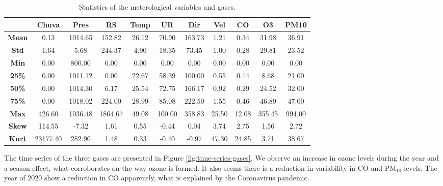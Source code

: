\begin{table*}[t]
    \centering
    \begin{tabular}{|c|c|c|c|c|c|c|c|c|c|c|}
        \hline
        {} & {\bf Chuva} &  {\bf Pres} & {\bf RS} & {\bf Temp} & {\bf UR} &
        {\bf Dir} & {\bf Vel} & {\bf CO} & {\bf O3} & {\bf PM10} \\
        \hline
        {\bf Mean}  &       0.13 &    1014.65 &     152.82 &      26.12 &      70.90
        &     163.73 &       1.21 &       0.34 &      31.98 &      36.91 \\
        \hline
        {\bf Std}   &       1.64 &       5.68 &     244.37 &       4.90 &      18.35
        &      73.45 &       1.00 &       0.28 &      29.81 &      23.52 \\
        \hline
        {\bf Min}   &       0.00 &     800.00 &       0.00 &       0.00 &       0.00
        &       0.00 &       0.00 &       0.00 &       0.00 &       0.00 \\
        \hline
        {\bf 25\%}   &       0.00 &    1011.12 &       0.00 &      22.67 &
        58.39 &     100.00 &       0.55 &       0.14 &       8.68 &      21.00
        \\
        \hline
        {\bf 50\%}   &       0.00 &    1014.30 &       6.17 &      25.54 &
        72.75 &     166.17 &       0.92 &       0.29 &      24.52 &      32.00
        \\
        \hline
        {\bf 75\%}   &       0.00 &    1018.02 &     224.00 &      28.99 &
        85.08 &     222.50 &       1.55 &       0.46 &      46.89 &      47.00
        \\
        \hline
        {\bf Max}   &     426.60 &    1036.48 &    1864.67 &      49.08 &     100.00
        &     358.83 &      25.50 &      12.08 &     355.45 &     994.00 \\
        \hline
        {\bf Skew}  &     114.55 &      -7.32 &       1.61 &       0.55 &      -0.44
        &       0.04 &       3.74 &       2.75 &       1.56 &       2.72 \\
        \hline
        {\bf Kurt}  &   23177.40 &     282.90 &       1.48 &       0.33 &      -0.40
        &      -0.97 &      47.30 &      24.85 &       3.71 &      38.67 \\
        \hline
    \end{tabular}
    \caption{Statistics of the meterological variables and gases.}
    \label{tab:statistics-variables}
\end{table*}


The time series of the three gases are presented in Figure
\ref{fig:time-series-gases}. We observe an increase in ozone levels during the
year and a season effect, what corroborates on the way ozone is formed.  It
also seems there is a reduction in variability in CO and PM$_{10}$ levels. The
year of 2020 show a reduction in CO apparently, what is explained by the
Coronavirus pandemic. 

